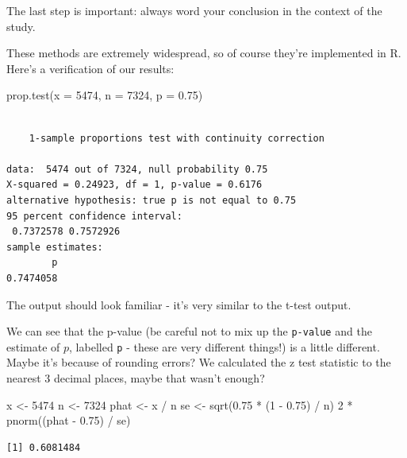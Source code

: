 \documentclass[
  letterpaper,
  DIV=11,
  numbers=noendperiod,
  oneside]{scrreprt}
\newenvironment{Shaded}{\begin{snugshade}}{\end{snugshade}}
\newcommand{\AttributeTok}[1]{\textcolor[rgb]{0.40,0.45,0.13}{#1}}
\newcommand{\DecValTok}[1]{\textcolor[rgb]{0.68,0.00,0.00}{#1}}
\newcommand{\FloatTok}[1]{\textcolor[rgb]{0.68,0.00,0.00}{#1}}
\newcommand{\FunctionTok}[1]{\textcolor[rgb]{0.28,0.35,0.67}{#1}}
\newcommand{\NormalTok}[1]{\textcolor[rgb]{0.00,0.23,0.31}{#1}}
\newcommand{\OtherTok}[1]{\textcolor[rgb]{0.00,0.23,0.31}{#1}}
\newcommand{\SpecialCharTok}[1]{\textcolor[rgb]{0.37,0.37,0.37}{#1}}
\begin{document}
The last step is important: always word your conclusion in the context
of the study.

These methods are extremely widespread, so of course they're implemented
in R. Here's a verification of our results:

\begin{Shaded}
\begin{Highlighting}[]
\FunctionTok{prop.test}\NormalTok{(}\AttributeTok{x =} \DecValTok{5474}\NormalTok{, }\AttributeTok{n =} \DecValTok{7324}\NormalTok{, }\AttributeTok{p =} \FloatTok{0.75}\NormalTok{)}
\end{Highlighting}
\end{Shaded}

\begin{verbatim}

    1-sample proportions test with continuity correction

data:  5474 out of 7324, null probability 0.75
X-squared = 0.24923, df = 1, p-value = 0.6176
alternative hypothesis: true p is not equal to 0.75
95 percent confidence interval:
 0.7372578 0.7572926
sample estimates:
        p 
0.7474058 
\end{verbatim}

The output should look familiar - it's very similar to the t-test
output.

We can see that the p-value (be careful not to mix up the
\texttt{p-value} and the estimate of \(p\), labelled \texttt{p} - these
are very different things!) is a little different. Maybe it's because of
rounding errors? We calculated the z test statistic to the nearest 3
decimal places, maybe that wasn't enough?

\begin{Shaded}
\begin{Highlighting}[]
\NormalTok{x }\OtherTok{\textless{}{-}} \DecValTok{5474}
\NormalTok{n }\OtherTok{\textless{}{-}} \DecValTok{7324}
\NormalTok{phat }\OtherTok{\textless{}{-}}\NormalTok{ x }\SpecialCharTok{/}\NormalTok{ n}
\NormalTok{se }\OtherTok{\textless{}{-}} \FunctionTok{sqrt}\NormalTok{(}\FloatTok{0.75} \SpecialCharTok{*}\NormalTok{ (}\DecValTok{1} \SpecialCharTok{{-}} \FloatTok{0.75}\NormalTok{) }\SpecialCharTok{/}\NormalTok{ n)}
\DecValTok{2} \SpecialCharTok{*} \FunctionTok{pnorm}\NormalTok{((phat }\SpecialCharTok{{-}} \FloatTok{0.75}\NormalTok{) }\SpecialCharTok{/}\NormalTok{ se)}
\end{Highlighting}
\end{Shaded}

\begin{verbatim}
[1] 0.6081484
\end{verbatim}
\end{document}
